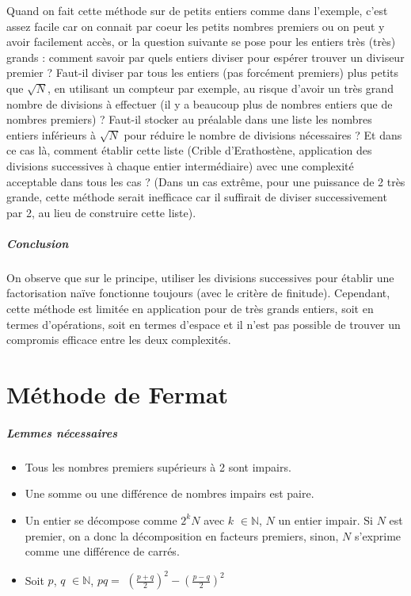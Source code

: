 \documentclass[11pt,a4paper]{article}
\begin{document}
	Quand on fait cette méthode sur de petits entiers comme dans l'exemple, c'est assez facile car on connait par coeur les petits nombres premiers ou on peut y avoir facilement accès, or la question suivante se pose pour les entiers très (très) grands : comment savoir par quels entiers diviser pour espérer trouver un diviseur premier ? Faut-il diviser par tous les entiers (pas forcément premiers) plus petits que $\sqrt{N}$, en utilisant un compteur par exemple, au risque d'avoir un très grand nombre de divisions à effectuer (il y a beaucoup plus de nombres entiers que de nombres premiers) ? Faut-il stocker au préalable dans une liste les nombres entiers inférieurs à $\sqrt{N}$ pour réduire le nombre de divisions nécessaires ? Et dans ce cas là, comment établir cette liste (Crible d'Erathostène, application des divisions successives à chaque entier intermédiaire) avec une complexité acceptable dans tous les cas ? (Dans un cas extrême, pour une puissance de 2 très grande, cette méthode serait inefficace car il suffirait de diviser successivement par 2, au lieu de construire cette liste).
	
	\subparagraph{Conclusion}
	
	On observe que sur le principe, utiliser les divisions successives pour établir une factorisation naïve fonctionne toujours (avec le critère de finitude). Cependant, cette méthode est limitée en application pour de très grands entiers, soit en termes d'opérations, soit en termes d'espace et il n'est pas possible de trouver un compromis efficace entre les deux complexités.
	

	\newpage
	
	\section{\LARGE{Méthode de Fermat}}
	
		\subparagraph{Lemmes nécessaires}
	\begin{itemize}
		\item Tous les nombres premiers supérieurs à 2 sont impairs.
		
		\item Une somme ou une différence de nombres impairs est paire.
		
		\item 	Un entier se décompose comme $2^{k}N$ avec $\mathit{k}$ $\in\mathbb{N}$, $\mathit{N}$ un entier impair. Si $\mathit{N}$ est premier, on a donc la décomposition en facteurs premiers, sinon, $\mathit{N}$ s'exprime comme une différence de carrés.
		
		\item Soit $\mathit{p}$, $\mathit{q}$ $\in\mathbb{N}$, $\mathit{pq = }$ $\mathit{\left( \frac{p+q}{2} \right) ^2 - \left( \frac{p-q}{2} \right) ^2}$
	\end{itemize}
		
\end{document}
